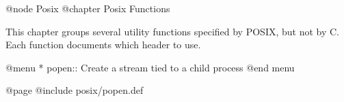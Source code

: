 @node Posix
@chapter Posix Functions

This chapter groups several utility functions specified by POSIX, but
not by C.  Each function documents which header to use.

@menu
* popen::       Create a stream tied to a child process
@end menu

@page
@include posix/popen.def

